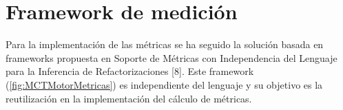 \section{Framework de medición}
Para la implementación de las métricas se ha seguido la solución basada en frameworks propuesta en Soporte de Métricas con Independencia del Lenguaje para la Inferencia de Refactorizaciones [8]. Este framework (\ref{fig:MCTMotorMetricas}) es independiente del lenguaje y su objetivo es la reutilización en la implementación del cálculo de métricas.
